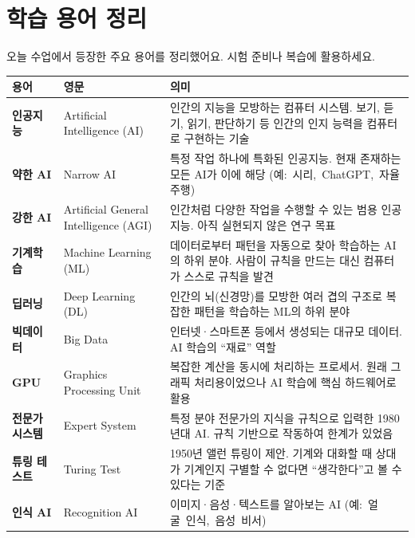 \documentclass[11pt,a4paper]{article}
\renewcommand{\arraystretch}{1.4}
\begin{document}
\newpage

\section{ 학습 용어 정리}

오늘 수업에서 등장한 주요 용어를 정리했어요. 시험 준비나 복습에 활용하세요.

\begin{center}
\renewcommand{\arraystretch}{1.5}
\begin{tabular}{|p{3cm}|p{3.5cm}|p{6.5cm}|}
\hline
\rowcolor{tableheader}
\textbf{용어} & \textbf{영문} & \textbf{의미} \\
\hline
\textbf{인공지능} & Artificial Intelligence \mbox{(AI)} & 인간의 지능을 모방하는 컴퓨터 시스템. 보기, 듣기, 읽기, 판단하기 등 인간의 인지 능력을 컴퓨터로 구현하는 기술 \\
\hline
\textbf{약한 AI} & Narrow AI & 특정 작업 하나에 특화된 인공지능. 현재 존재하는 모든 AI가 이에 해당 \mbox{(예: 시리, ChatGPT, 자율주행)} \\
\hline
\textbf{강한 AI} & Artificial General Intelligence \mbox{(AGI)} & 인간처럼 다양한 작업을 수행할 수 있는 범용 인공지능. 아직 실현되지 않은 연구 목표 \\
\hline
\textbf{기계학습} & Machine Learning \mbox{(ML)} & 데이터로부터 패턴을 자동으로 찾아 학습하는 AI의 하위 분야. 사람이 규칙을 만드는 대신 컴퓨터가 스스로 규칙을 발견 \\
\hline
\textbf{딥러닝} & Deep Learning \mbox{(DL)} & 인간의 뇌\mbox{(신경망)}를 모방한 여러 겹의 구조로 복잡한 패턴을 학습하는 ML의 하위 분야 \\
\hline
\textbf{빅데이터} & Big Data & 인터넷·스마트폰 등에서 생성되는 대규모 데이터. AI 학습의 \mbox{``재료''} 역할 \\
\hline
\textbf{GPU} & Graphics Processing Unit & 복잡한 계산을 동시에 처리하는 프로세서. 원래 그래픽 처리용이었으나 AI 학습에 핵심 하드웨어로 활용 \\
\hline
\textbf{전문가 시스템} & Expert System & 특정 분야 전문가의 지식을 규칙으로 입력한 1980년대 AI. 규칙 기반으로 작동하여 한계가 있었음 \\
\hline
\textbf{튜링 테스트} & Turing Test & 1950년 앨런 튜링이 제안. 기계와 대화할 때 상대가 기계인지 구별할 수 없다면 \mbox{``생각한다''}고 볼 수 있다는 기준 \\
\hline
\textbf{인식 AI} & Recognition AI & 이미지·음성·텍스트를 알아보는 AI \mbox{(예: 얼굴 인식, 음성 비서)} \\

\end{tabular}
\end{center}
\end{document}
